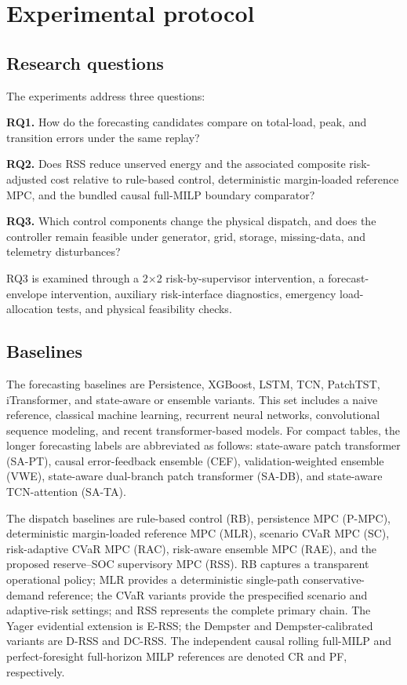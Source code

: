 \section{Experimental protocol}\label{experimental-protocol}

\subsection{Research questions}\label{research-questions}

The experiments address three questions:

\textbf{RQ1.} How do the forecasting candidates compare on total-load,
peak, and transition errors under the same replay?

\textbf{RQ2.} Does RSS reduce unserved energy and the associated composite
risk-adjusted cost relative to rule-based control, deterministic margin-loaded
reference MPC, and the bundled causal full-MILP boundary comparator?

\textbf{RQ3.} Which control components change the physical dispatch, and does
the controller remain feasible under generator, grid, storage, missing-data,
and telemetry disturbances?

RQ3 is examined through a 2$\times$2 risk-by-supervisor intervention, a
forecast-envelope intervention, auxiliary risk-interface diagnostics,
emergency load-allocation tests, and physical feasibility checks.

\subsection{Baselines}\label{baselines}

The forecasting baselines are Persistence, XGBoost, LSTM, TCN, PatchTST,
iTransformer, and state-aware or ensemble variants. This set includes a
naive reference, classical machine learning, recurrent neural networks,
convolutional sequence modeling, and recent transformer-based models.
For compact tables, the longer forecasting labels are abbreviated as follows:
state-aware patch transformer (SA-PT), causal error-feedback ensemble (CEF),
validation-weighted ensemble (VWE), state-aware dual-branch patch transformer
(SA-DB), and state-aware TCN-attention (SA-TA).

The dispatch baselines are rule-based control (RB), persistence MPC (P-MPC),
deterministic margin-loaded reference MPC (MLR), scenario CVaR MPC (SC),
risk-adaptive CVaR MPC (RAC), risk-aware ensemble MPC (RAE), and the proposed
reserve--SOC supervisory MPC (RSS). RB captures a transparent operational
policy; MLR provides a deterministic single-path conservative-demand reference;
the CVaR variants provide the prespecified scenario and adaptive-risk
settings; and RSS represents the complete primary chain. The Yager evidential
extension is E-RSS; the Dempster and Dempster-calibrated
variants are D-RSS and DC-RSS. The
independent causal rolling full-MILP and perfect-foresight full-horizon MILP
references are denoted CR and PF, respectively.

